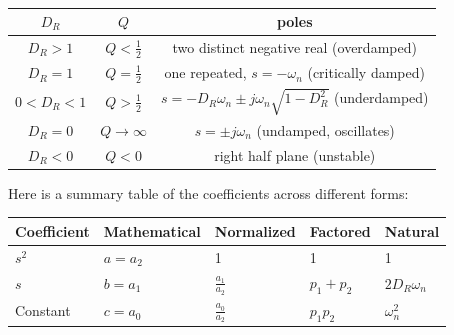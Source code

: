 \begin{enumerate}
\begin{align*}
    \end{align*}
    \begin{tabular}{|c|c|c|}\hline
      \(D_R\) & \(Q\) & poles \\ \hline
      \(D_R > 1\) & \(Q < \frac{1}{2}\) & two distinct negative real (overdamped) \\ \hline
      \(D_R = 1\) & \(Q = \frac{1}{2}\) & one repeated, \(s = -\omega_n\) (critically damped) \\ \hline
      \(0 < D_R < 1\) & \(Q > \frac{1}{2}\) & \(s = -D_R\omega_n \pm j\omega_n\sqrt{1 - D_R^2}\) (underdamped) \\ \hline
      \(D_R = 0\) & \(Q \to \infty\) & \(s = \pm j\omega_n\) (undamped, oscillates) \\ \hline
      \(D_R < 0\) & \(Q < 0\) & right half plane (unstable) \\ \hline
    \end{tabular}
\end{enumerate}

Here is a summary table of the coefficients across different forms:

\begin{center}
  \begin{tabularx}{\linewidth}{|X|X|X|X|X|}
    \hline
    \textbf{Coefficient} & \textbf{Mathematical} & \textbf{Normalized} & \textbf{Factored} & \textbf{Natural} \\
    \hline
    \(s^2\) & \(a = a_2\) & 1 & 1 & 1 \\
    \hline
    \(s\) & \(b = a_1\) & \(\displaystyle\frac{a_1}{a_2}\) & \(p_1 + p_2\) & \(2D_R\omega_n\) \\
    \hline
    Constant & \(c = a_0\) & \(\displaystyle\frac{a_0}{a_2}\) & \(p_1 p_2\) & \(\omega_n^2\) \\
    \hline
  \end{tabularx}
\end{center}

